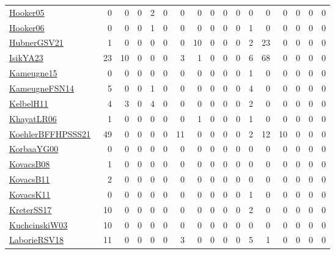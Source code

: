 {\begin{longtable}{l*{16}{r}}
\href{articles/Hooker05.pdf}{Hooker05}~\cite{Hooker05} & 0 & 0 & 0 & 2 & 0 & 0 & 0 & 0 & 0 & 0 & 0 & 0 & 0 & 0 & 0 & 0\\
\href{articles/Hooker06.pdf}{Hooker06}~\cite{Hooker06} & 0 & 0 & 0 & 1 & 0 & 0 & 0 & 0 & 0 & 0 & 1 & 0 & 0 & 0 & 0 & 0\\
\href{articles/HubnerGSV21.pdf}{HubnerGSV21}~\cite{HubnerGSV21} & 1 & 0 & 0 & 0 & 0 & 0 & 10 & 0 & 0 & 0 & 2 & 23 & 0 & 0 & 0 & 0\\
\href{articles/IsikYA23.pdf}{IsikYA23}~\cite{IsikYA23} & 23 & 10 & 0 & 0 & 0 & 3 & 1 & 0 & 0 & 0 & 6 & 68 & 0 & 0 & 0 & 0\\
\href{articles/Kameugne15.pdf}{Kameugne15}~\cite{Kameugne15} & 0 & 0 & 0 & 0 & 0 & 0 & 0 & 0 & 0 & 0 & 1 & 0 & 0 & 0 & 0 & 0\\
\href{articles/KameugneFSN14.pdf}{KameugneFSN14}~\cite{KameugneFSN14} & 5 & 0 & 0 & 1 & 0 & 0 & 0 & 0 & 0 & 0 & 4 & 0 & 0 & 0 & 0 & 0\\
\href{articles/KelbelH11.pdf}{KelbelH11}~\cite{KelbelH11} & 4 & 3 & 0 & 4 & 0 & 0 & 0 & 0 & 0 & 0 & 2 & 0 & 0 & 0 & 0 & 0\\
\href{articles/KhayatLR06.pdf}{KhayatLR06}~\cite{KhayatLR06} & 1 & 0 & 0 & 0 & 0 & 0 & 1 & 0 & 0 & 0 & 1 & 0 & 0 & 0 & 0 & 0\\
\href{articles/KoehlerBFFHPSSS21.pdf}{KoehlerBFFHPSSS21}~\cite{KoehlerBFFHPSSS21} & 49 & 0 & 0 & 0 & 0 & 11 & 0 & 0 & 0 & 0 & 2 & 12 & 10 & 0 & 0 & 0\\
\href{articles/KorbaaYG00.pdf}{KorbaaYG00}~\cite{KorbaaYG00} & 0 & 0 & 0 & 0 & 0 & 0 & 0 & 0 & 0 & 0 & 0 & 0 & 0 & 0 & 0 & 0\\
\href{articles/KovacsB08.pdf}{KovacsB08}~\cite{KovacsB08} & 1 & 0 & 0 & 0 & 0 & 0 & 0 & 0 & 0 & 0 & 0 & 0 & 0 & 0 & 0 & 0\\
\href{articles/KovacsB11.pdf}{KovacsB11}~\cite{KovacsB11} & 2 & 0 & 0 & 0 & 0 & 0 & 0 & 0 & 0 & 0 & 0 & 0 & 0 & 0 & 0 & 0\\
\href{articles/KovacsK11.pdf}{KovacsK11}~\cite{KovacsK11} & 0 & 0 & 0 & 0 & 0 & 0 & 0 & 0 & 0 & 0 & 1 & 0 & 0 & 0 & 0 & 0\\
\href{articles/KreterSS17.pdf}{KreterSS17}~\cite{KreterSS17} & 10 & 0 & 0 & 0 & 0 & 0 & 0 & 0 & 0 & 0 & 2 & 0 & 0 & 0 & 0 & 0\\
\href{articles/KuchcinskiW03.pdf}{KuchcinskiW03}~\cite{KuchcinskiW03} & 10 & 0 & 0 & 0 & 0 & 0 & 0 & 0 & 0 & 0 & 0 & 0 & 0 & 0 & 0 & 0\\
\href{articles/LaborieRSV18.pdf}{LaborieRSV18}~\cite{LaborieRSV18} & 11 & 0 & 0 & 0 & 0 & 3 & 0 & 0 & 0 & 0 & 5 & 1 & 0 & 0 & 0 & 0\\

\end{longtable}}
